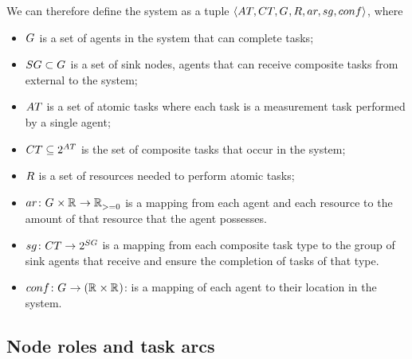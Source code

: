 We can therefore define the system as a tuple $\langle \setAtomicTask{}{}, \setCompositeTask{}{},  \setAgents{}{}, \setResource{}{}, ar, sg, conf \rangle$, where
\begin{itemize}
	\item $G_{}^{}$ is a set of agents in the system that can complete tasks;
	\item $\setSinkAgents{}{} \subset \setAgents{}{}$ is a set of sink nodes, agents that can receive composite tasks from external to the system;
	\item $\setAtomicTask{}{}$ is a set of atomic tasks where each task is a measurement task performed by a single agent;
	\item $\setCompositeTask{}{} \subseteq \powerSetSymbol{\setAtomicTask{}{}}{}{}$ is the set of composite tasks that occur in the system;
	\item $\setResource{}{}$ is a set of resources needed to perform atomic tasks;
	  \item $\formalAgentResources{}{}$ is a mapping from each agent and each resource to the amount of that resource that the agent possesses.
	\item $\formalSinkMapping{}{}$ is a mapping from each composite task type to the group of sink agents that receive and ensure the completion of tasks of that type.
	\item $\formalDeployment{}{}$: is a mapping of each agent to their location in the system.
\end{itemize}

\subsection{Node roles and task arcs}
\newcommand{\formalSinkRole}[2]{
	\functionFormal{sink}
	{\setAtomicTask{}{}}
	{\setAgents{}{}}
}
\newcommand{\formalSenseRole}[2]{
	\functionFormal{sensor}
	{\setAtomicTask{}{}}
	{\setAgents{}{}}
}
\newcommand{\formalActiveRole}[2]{
	\functionFormal{active}
	{\setAtomicTask{}{}}
	{\powerSetAgents{}{}}
}
\newcommand{\formalIdleRole}[2]{
	\functionFormal{idle_{\setTime{}{}}}
	{\setAtomicTask{}{}}
	{\powerSetAgents{}{}}
}
\newcommand{\formalSleepRole}[2]{
	\functionFormal{sleep_{\setTime{}{}}}
	{\setAtomicTask{}{}}
	{\powerSetAgents{}{}}
}
\newcommand{\functionSinkRole}[2]{\functionSignature{sink}{\varAtomicTask{}{}}}
	
\newcommand{\functionSenseRole}[2]{\functionSignature{sensor}{\varAtomicTask{}{}}}
\newcommand{\functionActiveRole}[2]{\functionSignature{active_{#1}}{\varAtomicTask{}{}}}
\newcommand{\functionIdleRole}[2]{\functionSignature{idle}{\varAtomicTask{}{}}}
\newcommand{\functionSleepRole}[2]{\functionSignature{sleep}{\varAtomicTask{}{}}}

